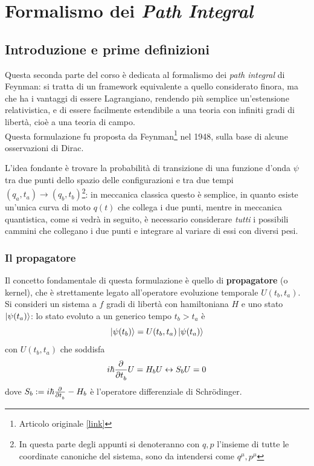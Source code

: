 \newpage
\chapter{Formalismo dei \textit{Path Integral}}
\section{Introduzione e prime definizioni}
Questa seconda parte del corso è dedicata al formalismo dei \textit{path integral} di Feynman:
si tratta di un framework equivalente a quello considerato finora, ma che ha i vantaggi di essere 
Lagrangiano, rendendo più semplice un'estensione relativistica, e di essere facilmente estendibile a
una teoria con infiniti gradi di libertà, cioè a una teoria di campo.\\
Questa formulazione fu proposta da Feynman\footnote
{Articolo originale \hyperlink{https://web.archive.org/web/20200917091657/https://authors.library.caltech.edu/47756/1/FEYrmp48.pdf}{[link]}}
nel 1948, sulla base di alcune osservazioni di Dirac.

L'idea fondante è trovare la probabilità di transizione di una funzione d'onda $\psi$ tra due punti dello
spazio delle configurazioni e tra due tempi $\left(q_a,t_a\right)\rightarrow\left(q_b,t_b\right)$\footnote
{In questa parte degli appunti si denoteranno con $q,p$ l'insieme di tutte le coordinate canoniche del
sistema, sono da intendersi come $q^\mu,p^\mu$}:
in meccanica classica questo è semplice, in quanto esiste un'unica curva di moto $q(t)$ che collega i
due punti, mentre in meccanica quantistica, come si vedrà in seguito, è necessario considerare \textit{tutti}
i possibili cammini che collegano i due punti e integrare al variare di essi con diversi pesi.

\subsection{Il propagatore}
Il concetto fondamentale di questa formulazione è quello di \textbf{propagatore} (o kernel), che è
strettamente legato all'operatore evoluzione temporale $U(t_b,t_a)$.\\
Si consideri un sistema a $f$ gradi di libertà con hamiltoniana $H$ e uno stato $\ket{\psi(t_a)}$:
lo stato evoluto a un generico tempo $t_b>t_a$ è
$$\ket{\psi(t_b)}=U(t_b,t_a)\ket{\psi(t_a)}$$
con $U(t_b,t_a)$ che soddisfa
$$i\hbar\pdv[]{}{t_b}U = H_bU \leftrightarrow S_bU=0$$
dove $S_b:=i\hbar\pdv[]{}{t_b}-H_b$ è l'operatore differenziale di Schrödinger.

